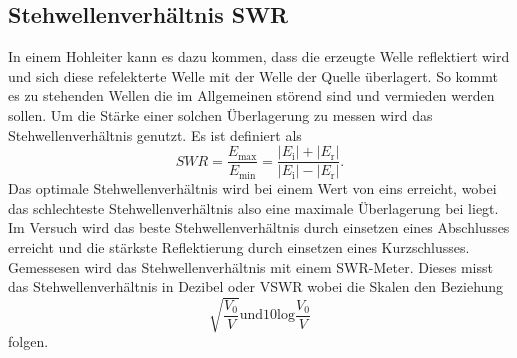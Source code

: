 \subsection{Stehwellenverhältnis SWR}
In einem Hohleiter kann es dazu kommen, dass die erzeugte Welle reflektiert wird und sich diese refelekterte Welle mit der Welle der Quelle überlagert.
So kommt es zu stehenden Wellen die im Allgemeinen störend sind und vermieden werden sollen.
Um die Stärke einer solchen Überlagerung zu messen wird das Stehwellenverhältnis  genutzt.
Es ist definiert als 
\begin{equation}
    SWR = \frac{E _\text{max}}{E _\text{min}} = \frac{\left | E _\text{i} \right | + \left | E _\text{r} \right |}{\left | E _\text{i} \right | - \left | E _\text{r} \right |}.
\end{equation}
Das optimale Stehwellenverhältnis wird bei einem Wert von eins erreicht, wobei das schlechteste Stehwellenverhältnis also eine maximale Überlagerung bei \symup{\inf} liegt.
Im Versuch wird das beste Stehwellenverhältnis durch einsetzen eines Abschlusses erreicht und die stärkste Reflektierung durch einsetzen eines Kurzschlusses.
Gemessesen wird das Stehwellenverhältnis mit einem SWR-Meter.
Dieses misst das Stehwellenverhältnis in Dezibel oder VSWR wobei die Skalen den Beziehung
\begin{equation*}
    \sqrt{\frac{V_0}{V}} \text{und} 10 \text{log} \frac{V_0}{V} 
\end{equation*}
folgen.

